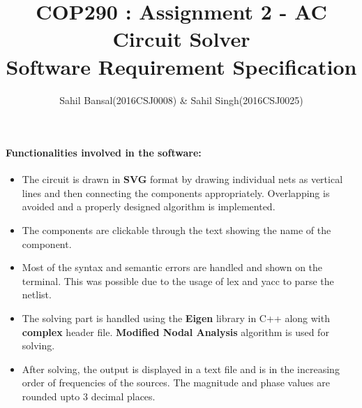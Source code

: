 \documentclass[]{article}
\title{\textbf{COP290 : Assignment 2 - AC Circuit Solver\\Software Requirement Specification}}
\author{Sahil Bansal(2016CSJ0008) \& Sahil Singh(2016CSJ0025)}
\begin{document}
\maketitle
\vspace{1ex}
\paragraph{
	\LARGE{Functionalities involved in the software:}\newline
}
\Large
\begin{itemize}
	\item The circuit is drawn in \textbf{SVG} format by drawing individual nets as vertical lines and then connecting the components appropriately. Overlapping is avoided and a properly designed algorithm is implemented.
	\item The components are clickable through the text showing the name of the component.
	\item Most of the syntax and semantic errors are handled and shown on the terminal. This was possible due to the usage of lex and yacc to parse the netlist. 
	\item The solving part is handled using the \textbf{Eigen} library in C++ along with \textbf{complex} header file. \textbf{Modified Nodal Analysis} algorithm is used for solving. 
	\item After solving, the output is displayed in a text file and is in the increasing order of frequencies of the sources. The magnitude and phase values are rounded upto 3 decimal places.
\end{itemize}
\end{document}
